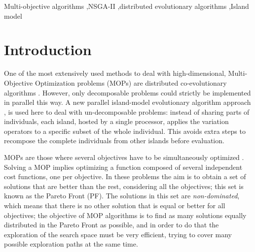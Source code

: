 \documentclass[preprint]{elsarticle}
\newenvironment{bluecolor}{\par\color{blue}}{\par}
\begin{document}
\begin{frontmatter}
\begin{abstract}
\begin{bluecolor}
\end{bluecolor}

\end{abstract}


\begin{keyword}
Multi-objective algorithms \sep NSGA-II  \sep distributed evolutionary algorithms \sep Island model
\end{keyword}

\end{frontmatter}





\section{Introduction}


\begin{bluecolor}
One of the  most extensively used methods to deal with high-dimensional, Multi-Objective Optimization problems (MOPs) are distributed co-evolutionary algorithms \cite{Gong15models}. However, only decomposable problems could strictly be implemented in parallel this way. A new parallel island-model evolutionary algorithm approach \cite{Alba02Parallelism}, is used here to deal with un-decomposable problems: instead of sharing parts of individuals, each island, hosted by a single processor, applies the variation operators to a specific subset of the whole individual. This avoids extra steps to recompose the complete individuals from other islands before evaluation.
\end{bluecolor}


MOPs are those where several
objectives have to be simultaneously optimized
\citep{Mora13paretobased,LIU2017344}. Solving a MOP implies optimizing a function composed of several independent cost functions, one per objective. In
these problems the aim is to obtain a set of solutions that are better
than the rest, considering all the objectives; this set is known as
the Pareto Front (PF). The solutions in this set are {\em non-dominated},
which means that there is no other solution that is equal or better
for all objectives; the objective of MOP algorithms is to find as many
solutions equally distributed in the Pareto Front as possible, and in order to do that the
exploration of the search space must be very efficient, trying to
cover many possible exploration paths at the same time. 
\end{document}
